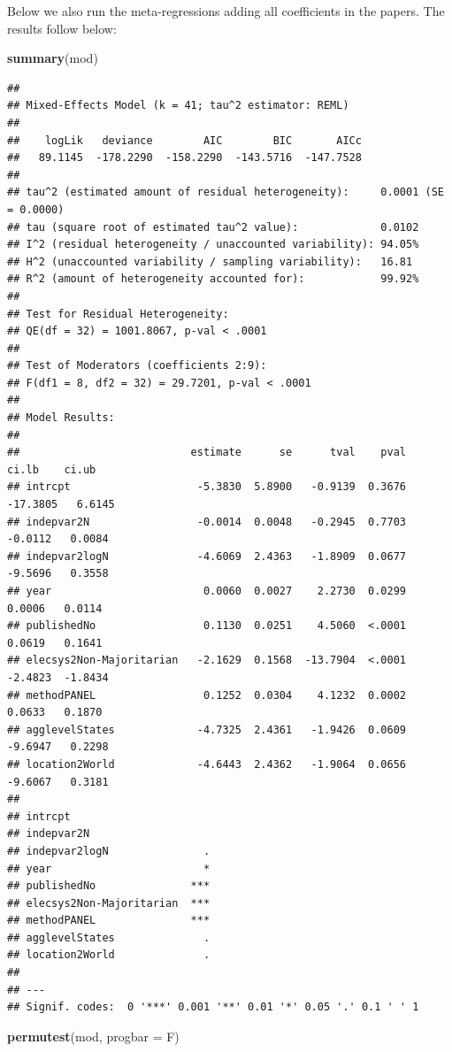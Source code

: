 \documentclass[
]{article}
\newenvironment{Shaded}{\begin{snugshade}}{\end{snugshade}}
\newcommand{\DataTypeTok}[1]{\textcolor[rgb]{0.13,0.29,0.53}{#1}}
\newcommand{\KeywordTok}[1]{\textcolor[rgb]{0.13,0.29,0.53}{\textbf{#1}}}
\newcommand{\NormalTok}[1]{#1}
\begin{document}
Below we also run the meta-regressions adding all coefficients in the
papers. The results follow below:

\begin{Shaded}
\begin{Highlighting}[]
\KeywordTok{summary}\NormalTok{(mod)}
\end{Highlighting}
\end{Shaded}

\begin{verbatim}
## 
## Mixed-Effects Model (k = 41; tau^2 estimator: REML)
## 
##    logLik   deviance        AIC        BIC       AICc 
##   89.1145  -178.2290  -158.2290  -143.5716  -147.7528   
## 
## tau^2 (estimated amount of residual heterogeneity):     0.0001 (SE = 0.0000)
## tau (square root of estimated tau^2 value):             0.0102
## I^2 (residual heterogeneity / unaccounted variability): 94.05%
## H^2 (unaccounted variability / sampling variability):   16.81
## R^2 (amount of heterogeneity accounted for):            99.92%
## 
## Test for Residual Heterogeneity:
## QE(df = 32) = 1001.8067, p-val < .0001
## 
## Test of Moderators (coefficients 2:9):
## F(df1 = 8, df2 = 32) = 29.7201, p-val < .0001
## 
## Model Results:
## 
##                           estimate      se      tval    pval     ci.lb    ci.ub 
## intrcpt                    -5.3830  5.8900   -0.9139  0.3676  -17.3805   6.6145 
## indepvar2N                 -0.0014  0.0048   -0.2945  0.7703   -0.0112   0.0084 
## indepvar2logN              -4.6069  2.4363   -1.8909  0.0677   -9.5696   0.3558 
## year                        0.0060  0.0027    2.2730  0.0299    0.0006   0.0114 
## publishedNo                 0.1130  0.0251    4.5060  <.0001    0.0619   0.1641 
## elecsys2Non-Majoritarian   -2.1629  0.1568  -13.7904  <.0001   -2.4823  -1.8434 
## methodPANEL                 0.1252  0.0304    4.1232  0.0002    0.0633   0.1870 
## agglevelStates             -4.7325  2.4361   -1.9426  0.0609   -9.6947   0.2298 
## location2World             -4.6443  2.4362   -1.9064  0.0656   -9.6067   0.3181 
##  
## intrcpt 
## indepvar2N 
## indepvar2logN               . 
## year                        * 
## publishedNo               *** 
## elecsys2Non-Majoritarian  *** 
## methodPANEL               *** 
## agglevelStates              . 
## location2World              . 
## 
## ---
## Signif. codes:  0 '***' 0.001 '**' 0.01 '*' 0.05 '.' 0.1 ' ' 1
\end{verbatim}

\begin{Shaded}
\begin{Highlighting}[]
\KeywordTok{permutest}\NormalTok{(mod, }\DataTypeTok{progbar =}\NormalTok{ F)}
\end{Highlighting}
\end{Shaded}
\end{document}
